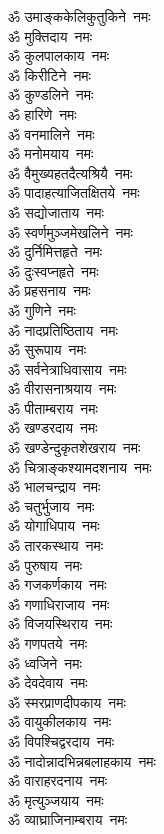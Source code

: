 \begin{multicols}{2}
\begin{flushleft}
ॐ उमाङ्ककेलिकुतुकिने~नमः\\
ॐ मुक्तिदाय~नमः\\
ॐ कुलपालकाय~नमः\\
ॐ किरीटिने~नमः\\
ॐ कुण्डलिने~नमः\\
ॐ हारिणे~नमः\hfill{}\\
ॐ वनमालिने~नमः\\
ॐ मनोमयाय~नमः\\
ॐ वैमुख्यहतदैत्यश्रियै~नमः\\
ॐ पादाहत्याजितक्षितये~नमः\\
ॐ सद्योजाताय~नमः\\
ॐ स्वर्णमुञ्जमेखलिने~नमः\\
ॐ दुर्निमित्तहृते~नमः\\
ॐ दुःस्वप्नहृते~नमः\\
ॐ प्रहसनाय~नमः\\
ॐ गुणिने~नमः\hfill{}\\
ॐ नादप्रतिष्ठिताय~नमः\\
ॐ सुरूपाय~नमः\\
ॐ सर्वनेत्राधिवासाय~नमः\\
ॐ वीरासनाश्रयाय~नमः\\
ॐ पीताम्बराय~नमः\\
ॐ खण्डरदाय~नमः\\
ॐ खण्डेन्दुकृतशेखराय~नमः\\
ॐ चित्राङ्कश्यामदशनाय~नमः\\
ॐ भालचन्द्राय~नमः\\
ॐ चतुर्भुजाय~नमः\hfill{}\\
ॐ योगाधिपाय~नमः\\
ॐ तारकस्थाय~नमः\\
ॐ पुरुषाय~नमः\\
ॐ गजकर्णकाय~नमः\\
ॐ गणाधिराजाय~नमः\\
ॐ विजयस्थिराय~नमः\\
ॐ गणपतये~नमः\\
ॐ ध्वजिने~नमः\\
ॐ देवदेवाय~नमः\\
ॐ स्मरप्राणदीपकाय~नमः\hfill{}\\
ॐ वायुकीलकाय~नमः\\
ॐ विपश्चिद्वरदाय~नमः\\
ॐ नादोन्नादभिन्नबलाहकाय~नमः\\
ॐ वाराहरदनाय~नमः\\
ॐ मृत्युञ्जयाय~नमः\\
ॐ व्याघ्राजिनाम्बराय~नमः\\

\end{flushleft}
\end{multicols}
